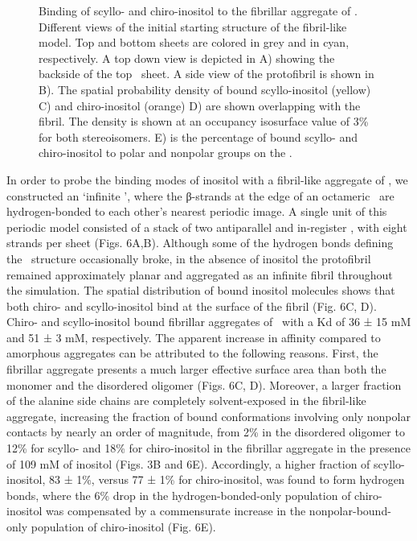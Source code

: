 \begin{figure}[ht]
  \caption[Binding of scyllo- and chiro-inositol to the fibrillar aggregate of \gafour.]{Binding of scyllo- and chiro-inositol to the fibrillar aggregate of \gafour. Different views of the initial starting structure of the fibril-like model. Top and bottom sheets are colored in grey and in cyan, respectively. A top down view is depicted in A) showing the backside of the top \gafour\ sheet. A side view of the protofibril is shown in B). The spatial probability density of bound scyllo-inositol (yellow) C) and chiro-inositol (orange) D) are shown overlapping with the fibril. The density is shown at an occupancy isosurface value of 3\% for both stereoisomers. E) is the percentage of bound scyllo- and chiro-inositol to polar and nonpolar groups on the \bsheet.}
   \label{fig:figure6}
\end{figure}

In order to probe the binding modes of inositol with a fibril-like aggregate of \gafour, we constructed an ‘infinite \bsheet’, where the β-strands at the edge of an octameric \bsheet\ are hydrogen-bonded to each other’s nearest periodic image. A single unit of this periodic model consisted of a stack of two antiparallel and in-register \bsheets, with eight strands per sheet (Figs. 6A,B). Although some of the hydrogen bonds defining the \bsheet\ structure occasionally broke, in the absence of inositol the protofibril remained approximately planar and aggregated as an infinite fibril throughout the simulation.
	The spatial distribution of bound inositol molecules shows that both chiro- and scyllo-inositol bind at the surface of the fibril (Fig. 6C, D). Chiro- and scyllo-inositol bound fibrillar aggregates of \gafour\ with a Kd of 36 ± 15 mM and 51 ± 3 mM, respectively. The apparent increase in affinity compared to amorphous aggregates can be attributed to the following reasons. First, the fibrillar aggregate presents a much larger effective surface area than both the monomer and the disordered oligomer (Figs. 6C, D). Moreover, a larger fraction of the alanine side chains are completely solvent-exposed in the fibril-like aggregate, increasing the fraction of bound conformations involving only nonpolar contacts by nearly an order of magnitude, from 2\% in the disordered oligomer to 12\% for scyllo- and 18\% for chiro-inositol in the fibrillar aggregate in the presence of 109 mM of inositol (Figs. 3B and 6E). Accordingly, a higher fraction of scyllo-inositol, 83 ± 1\%, versus 77 ± 1\% for chiro-inositol, was found to form hydrogen bonds, where the 6\% drop in the hydrogen-bonded-only population of chiro-inositol was compensated by a commensurate increase in the nonpolar-bound-only population of chiro-inositol (Fig. 6E).

